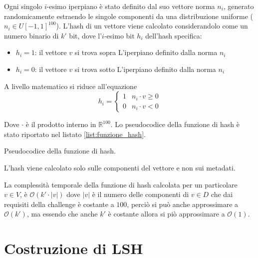 Ogni singolo $i$-esimo iperpiano è stato definito dal suo vettore norma $n_i$,
generato randomicamente estraendo le singole componenti da una distribuzione uniforme 
($n_i \in U[-1,1]^{100}$). L'hash di un vettore viene calcolato considerandolo 
come un numero binario di $k'$ bit, dove l'$i$-esimo bit $h_i$ dell'hash specifica:
\begin{itemize}
    \item $h_i = 1$: il vettore $v$ si trova sopra L'iperpiano definito dalla 
    norma $n_i$
    \item $h_i = 0$: il vettore $v$ si trova sotto L'iperpiano definito dalla 
    norma $n_i$
\end{itemize}

A livello matematico si riduce all'equazione 
$$h_i = \begin{cases}
    1 & n_i \cdot v \ge 0\\
    0 & n_i \cdot v < 0
\end{cases}$$ 

Dove $\cdot$ è il prodotto interno in $\mathbb{R}^{100}$. Lo pseudocodice della 
funzione di hash è stato riportato nel listato \ref{list:funzione_hash}.

\begin{algorithm}
    \SetAlgoLined

    \caption{Pseudocodice della funzione di hash.}
    \label{list:funzione_hash}
\end{algorithm}

\begin{nota}
    L'hash viene calcolato solo sulle componenti del vettore e non sui metadati.
\end{nota}

La complessità temporale della funzione di hash calcolata per un particolare $v\in V$,
è $\mathcal{O}(k' \cdot |v|)$ dove 
$|v|$ è il numero delle componenti di $v\in D$ che dai requisiti della challenge è
costante a $100$, perciò si può anche approssimare a $\mathcal{O}(k')$, ma essendo 
che anche $k'$ è costante allora si piò approssimare a $\mathcal{O}(1)$.

\section{Costruzione di LSH}

